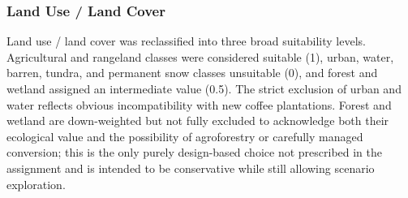 \documentclass[12pt,a4paper]{article}
\begin{document}
\subsubsection{Land Use / Land Cover}

Land use / land cover was reclassified into three broad suitability levels. Agricultural and rangeland classes were considered suitable (1), urban, water, barren, tundra, and permanent snow classes unsuitable (0), and forest and wetland assigned an intermediate value (0.5). The strict exclusion of urban and water reflects obvious incompatibility with new coffee plantations. Forest and wetland are down-weighted but not fully excluded to acknowledge both their ecological value and the possibility of agroforestry or carefully managed conversion; this is the only purely design-based choice not prescribed in the assignment and is intended to be conservative while still allowing scenario exploration.
\end{document}

